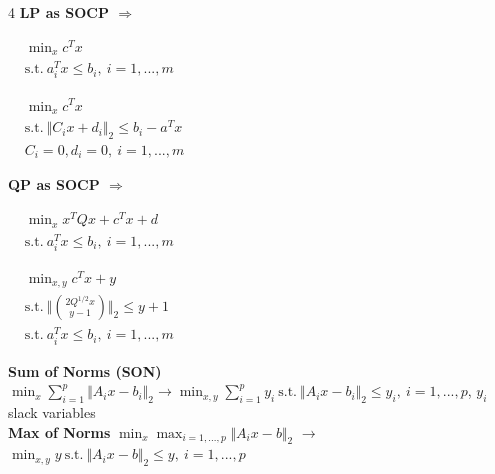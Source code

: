 \documentclass[a4paper]{article}
\begin{document}
\begin{multicols}{4}
    \noindent
    \textbf{LP as SOCP $\Longrightarrow$}
    \begin{center}
        $\begin{aligned}
            &\min_{x} c^T{x}\\
            &\text{s.t.} \ a_i^T{x}\le{b_i}, \ i=1,...,m
        \end{aligned}$
    \end{center}
    \newcolumn
    \begin{center}
        $\begin{aligned}
            &\min_{x} c^T{x}\\
            &\text{s.t.} \ \Vert C_i{x}+d_i \Vert_2 \le b_i-a^T{x}\\
            &C_i=0, d_i=0, \ i=1,...,m
        \end{aligned}$
    \end{center}
    \newcolumn
    \textbf{QP as SOCP $\Longrightarrow$}
    \begin{center}
        $\begin{aligned}
            &\min_{x} x^T{Q}x+c^T{x}+d\\
            &\text{s.t.} \ a_i^T{x} \le b_i, \ i=1,...,m
        \end{aligned}$
    \end{center}
    \newcolumn
    \begin{center}
        $\begin{aligned}
            &\min_{x,y} {c^T{x}+y}\\
            &\text{s.t.} \ \bigg\Vert\binom{2Q^{1/2}x}{y-1} \bigg\Vert_2 \le y+1 \\
            &\text{s.t.} \ a_i^T{x} \le b_i, \ i=1,...,m
        \end{aligned}$
    \end{center}
\end{multicols}
\noindent
\textbf{Sum of Norms (SON)} $\min_{x} \sum_{i=1}^p \Vert A_i x - b_i\Vert_2 \longrightarrow 
\min_{x,y} {\sum_{i=1}^p{y_i}} \ \text{s.t.} \  \Vert A_i x - b_i\Vert_2 \le y_i, \ i=1,...,p$, $y_i$ slack variables\\
\textbf{Max of Norms} $\min_{x} \max_{i=1,...,p} \Vert A_i{x}-b \Vert_2$ $\longrightarrow$ $\min_{x,y} y \ \text{s.t.} \
\Vert A_i{x}-b \Vert_2 \le y, \ i=1,...,p$\\
\end{document}
